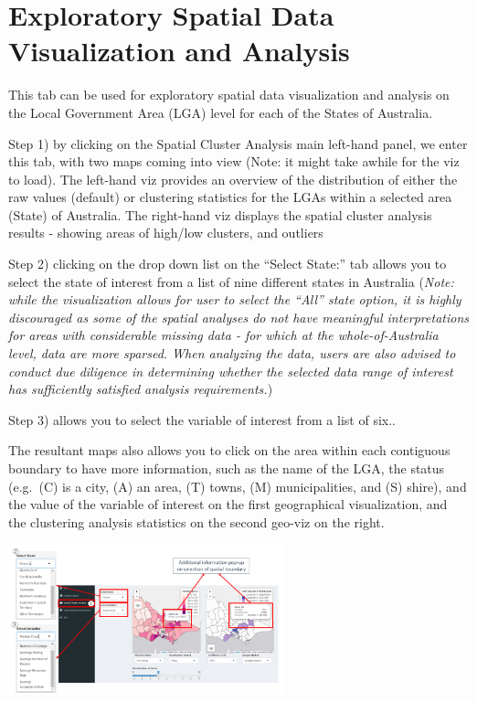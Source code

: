\documentclass[
]{article}
\begin{document}
\hypertarget{exploratory-spatial-data-visualization-and-analysis}{%
\section{Exploratory Spatial Data Visualization and
Analysis}\label{exploratory-spatial-data-visualization-and-analysis}}

This tab can be used for exploratory spatial data visualization and
analysis on the Local Government Area (LGA) level for each of the States
of Australia.

Step 1) by clicking on the Spatial Cluster Analysis main left-hand
panel, we enter this tab, with two maps coming into view (Note: it might
take awhile for the viz to load). The left-hand viz provides an overview
of the distribution of either the raw values (default) or clustering
statistics for the LGAs within a selected area (State) of Australia. The
right-hand viz displays the spatial cluster analysis results - showing
areas of high/low clusters, and outliers

Step 2) clicking on the drop down list on the ``Select State:'' tab
allows you to select the state of interest from a list of nine different
states in Australia (\emph{Note: while the visualization allows for user
to select the ``All'' state option, it is highly discouraged as some of
the spatial analyses do not have meaningful interpretations for areas
with considerable missing data - for which at the whole-of-Australia
level, data are more sparsed. When analyzing the data, users are also
advised to conduct due diligence in determining whether the selected
data range of interest has sufficiently satisfied analysis
requirements.})

Step 3) allows you to select the variable of interest from a list of
six..

The resultant maps also allows you to click on the area within each
contiguous boundary to have more information, such as the name of the
LGA, the status (e.g.~(C) is a city, (A) an area, (T) towns, (M)
municipalities, and (S) shire), and the value of the variable of
interest on the first geographical visualization, and the clustering
analysis statistics on the second geo-viz on the right.

\includegraphics[width=0.6\textwidth,height=\textheight]{images/geospatial1.png}
\end{document}
